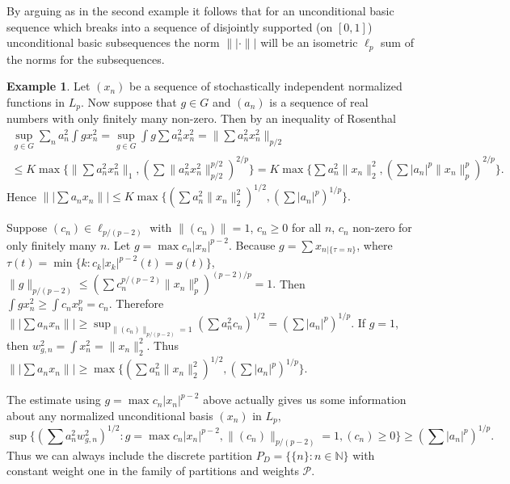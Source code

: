 \documentclass[12pt]{amsart}
\theoremstyle{definition}
\newtheorem{example}[theorem]{Example}
\theoremstyle{remark}
\numberwithin{equation}{section}
\begin{document}
By arguing as in the second example it follows that for an unconditional basic sequence
which breaks into a sequence of disjointly supported (on $[0,1]$)
unconditional basic subsequences the norm $\||\cdot \||$ will be an isometric $\ell_p$ sum of the norms for the subsequences.

\begin{example}
Let $(x_n)$ 
be a sequence of stochastically independent normalized functions in $L_p$.
Now suppose that $g \in G$ and $(a_n)$ is a sequence of real numbers
with only finitely many non-zero. Then by an inequality of Rosenthal
\cite[Lemma 1]{MR42:6602}
\begin{multline*} \sup_{g \in G} \sum_n
a_n^2 \int g x_n^2 =\sup_{g \in G} \int g \sum a_n^2 x_n^2 = \|\sum
a_n^2 x_n^2 \|_{p/2} \\ \le K \max \{\|\sum a_n^2 x_n^2 \|_1, \left (
\sum \|a_n^2 x_n^2\|_{p/2}^{p/2}\right )^{2/p}\} = K\max \{ \sum a_n^2
\|x_n\|_2^2, \left (\sum |a_n|^p \|x_n\|_p^p\right )^{2/p}\}.  \end{multline*}
Hence $\||\sum a_n x_n \|| \le K\max \{ \left (\sum a_n^2 \|x_n\|_2^2\right)^{1/2}, \left (\sum |a_n|^p\right )^{1/p}\}.$

Suppose $(c_n) \in \ell_{p/(p-2)}$ with $\|(c_n)\|=1$, $c_n \ge 0$ for all $n$, $c_n$ non-zero for only finitely many $n$. Let
$g = \max c_n |x_n|^{p-2}.$ Because $g=\sum x_n {}_{|\{\tau=n\}}$,
where $\tau(t) = \min \{k:c_k |x_k|^{p-2}(t)=g(t)\}$, $\|g\|_{p/(p-2)}\le (\sum
c^{p/(p-2)}_n \|x_n\|_p^p)^{(p-2)/p}=1.$ Then $\int g x_n^2 \ge \int c_n x_n^p
= c_n.$ Therefore $\||\sum a_n x_n \|| \ge \sup_{\|(c_n)\|_{p/(p-2)}=1}
(\sum a_n^2 c_n)^{1/2} = (\sum |a_n|^p)^{1/p}.$ If $g = 1$, then
$w_{g,n}^2=\int x_n^2 =\|x_n \|_2^2.$  Thus \newline $\||\sum a_n x_n \||
 \ge \max \{ \left (\sum a_n^2 \|x_n\|_2^2\right)^{1/2}, \left (\sum
 |a_n|^p\right )^{1/p}\}.$
\end{example}

The estimate using $g=\max c_n |x_n|^{p-2}$
above actually gives us some information about
any normalized unconditional basis $(x_n)$ in $L_p,$
$$\sup\{(\sum a_n^2 w_{g,n}^2)^{1/2}: g=\max c_n |x_n|^{p-2},\|(c_n)\|_{p/(p-2)}=1,
(c_n)\ge 0\} \ge (\sum |a_n|^p)^{1/p}.$$ Thus we can always include the
discrete partition $P_D=\{\{n\}:n\in \mathbb N\}$ with constant weight one
in the family of partitions and weights $\mathcal P.$
\end{document}
